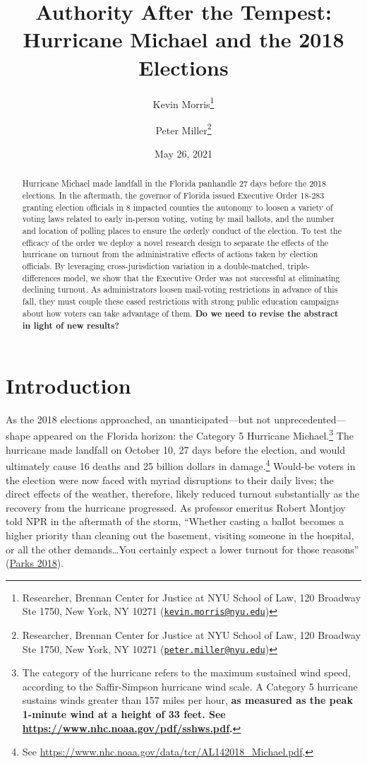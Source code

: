 \documentclass[
  12pt,
]{article}
\title{Authority After the Tempest: Hurricane Michael and the 2018 Elections}
\author{Kevin Morris\footnote{Researcher, Brennan Center for Justice at NYU School of Law, 120 Broadway Ste 1750, New York, NY 10271 (\href{mailto:kevin.morris@nyu.edu}{\nolinkurl{kevin.morris@nyu.edu}})} \and Peter Miller\footnote{Researcher, Brennan Center for Justice at NYU School of Law, 120 Broadway Ste 1750, New York, NY 10271 (\href{mailto:peter.miller@nyu.edu}{\nolinkurl{peter.miller@nyu.edu}})}}
\date{May 26, 2021}
\begin{document}
\maketitle
\begin{abstract}
Hurricane Michael made landfall in the Florida panhandle 27 days before the 2018 elections. In the aftermath, the governor of Florida issued Executive Order 18-283 granting election officials in 8 impacted counties the autonomy to loosen a variety of voting laws related to early in-person voting, voting by mail ballots, and the number and location of polling places to ensure the orderly conduct of the election. To test the efficacy of the order we deploy a novel research design to separate the effects of the hurricane on turnout from the administrative effects of actions taken by election officials. By leveraging cross-jurisdiction variation in a double-matched, triple-differences model, we show that the Executive Order was not successful at eliminating declining turnout. As administrators loosen mail-voting restrictions in advance of this fall, they must couple these eased restrictions with strong public education campaigns about how voters can take advantage of them. \textbf{Do we need to revise the abstract in light of new results?}
\end{abstract}

\pagebreak

\doublespacing

\hypertarget{introduction}{%
\section*{Introduction}\label{introduction}}

As the 2018 elections approached, an unanticipated---but not unprecedented---shape appeared on the Florida horizon: the Category 5 Hurricane Michael.\footnote{The category of the hurricane refers to the maximum sustained wind speed, according to the Saffir-Simpson hurricane wind scale. A Category 5 hurricane sustains winds greater than 157 miles per hour, \textbf{as measured as the peak 1-minute wind at a height of 33 feet. See \url{https://www.nhc.noaa.gov/pdf/sshws.pdf}.}} The hurricane made landfall on October 10, 27 days before the election, and would ultimately cause 16 deaths and 25 billion dollars in damage.\footnote{See \url{https://www.nhc.noaa.gov/data/tcr/AL142018_Michael.pdf}.} Would-be voters in the election were now faced with myriad disruptions to their daily lives; the direct effects of the weather, therefore, likely reduced turnout substantially as the recovery from the hurricane progressed. As professor emeritus Robert Montjoy told NPR in the aftermath of the storm, ``Whether casting a ballot becomes a higher priority than cleaning out the basement, visiting someone in the hospital, or all the other demands\ldots You certainly expect a lower turnout for those reasons'' (\protect\hyperlink{ref-Parks2018}{Parks 2018}).
\end{document}
